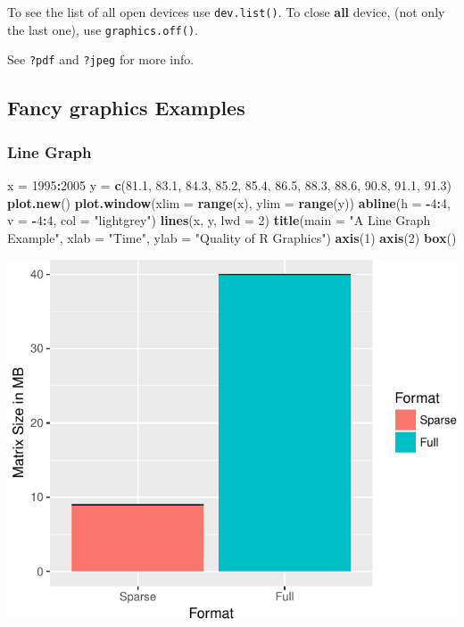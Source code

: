 \documentclass[]{book}
\newenvironment{Shaded}{\begin{snugshade}}{\end{snugshade}}
\newcommand{\KeywordTok}[1]{\textcolor[rgb]{0.13,0.29,0.53}{\textbf{#1}}}
\newcommand{\DataTypeTok}[1]{\textcolor[rgb]{0.13,0.29,0.53}{#1}}
\newcommand{\DecValTok}[1]{\textcolor[rgb]{0.00,0.00,0.81}{#1}}
\newcommand{\FloatTok}[1]{\textcolor[rgb]{0.00,0.00,0.81}{#1}}
\newcommand{\StringTok}[1]{\textcolor[rgb]{0.31,0.60,0.02}{#1}}
\newcommand{\OperatorTok}[1]{\textcolor[rgb]{0.81,0.36,0.00}{\textbf{#1}}}
\newcommand{\NormalTok}[1]{#1}
\theoremstyle{definition}
\theoremstyle{definition}
\theoremstyle{definition}
\theoremstyle{remark}
\begin{document}
To see the list of all open devices use \texttt{dev.list()}. To close
\textbf{all} device, (not only the last one), use
\texttt{graphics.off()}.

See \texttt{?pdf} and \texttt{?jpeg} for more info.

\subsection{Fancy graphics Examples}\label{fancy}

\subsubsection{Line Graph}\label{line-graph}

\begin{Shaded}
\begin{Highlighting}[]
\NormalTok{x =}\StringTok{ }\DecValTok{1995}\OperatorTok{:}\DecValTok{2005}
\NormalTok{y =}\StringTok{ }\KeywordTok{c}\NormalTok{(}\FloatTok{81.1}\NormalTok{, }\FloatTok{83.1}\NormalTok{, }\FloatTok{84.3}\NormalTok{, }\FloatTok{85.2}\NormalTok{, }\FloatTok{85.4}\NormalTok{, }\FloatTok{86.5}\NormalTok{, }\FloatTok{88.3}\NormalTok{, }\FloatTok{88.6}\NormalTok{, }\FloatTok{90.8}\NormalTok{, }\FloatTok{91.1}\NormalTok{, }\FloatTok{91.3}\NormalTok{)}
\KeywordTok{plot.new}\NormalTok{()}
\KeywordTok{plot.window}\NormalTok{(}\DataTypeTok{xlim =} \KeywordTok{range}\NormalTok{(x), }\DataTypeTok{ylim =} \KeywordTok{range}\NormalTok{(y))}
\KeywordTok{abline}\NormalTok{(}\DataTypeTok{h =} \OperatorTok{-}\DecValTok{4}\OperatorTok{:}\DecValTok{4}\NormalTok{, }\DataTypeTok{v =} \OperatorTok{-}\DecValTok{4}\OperatorTok{:}\DecValTok{4}\NormalTok{, }\DataTypeTok{col =} \StringTok{"lightgrey"}\NormalTok{)}
\KeywordTok{lines}\NormalTok{(x, y, }\DataTypeTok{lwd =} \DecValTok{2}\NormalTok{)}
\KeywordTok{title}\NormalTok{(}\DataTypeTok{main =} \StringTok{"A Line Graph Example"}\NormalTok{,}
        \DataTypeTok{xlab =} \StringTok{"Time"}\NormalTok{,}
        \DataTypeTok{ylab =} \StringTok{"Quality of R Graphics"}\NormalTok{)}
\KeywordTok{axis}\NormalTok{(}\DecValTok{1}\NormalTok{)}
\KeywordTok{axis}\NormalTok{(}\DecValTok{2}\NormalTok{)}
\KeywordTok{box}\NormalTok{()}
\end{Highlighting}
\end{Shaded}

\includegraphics[width=0.5\linewidth]{Rcourse_files/figure-latex/unnamed-chunk-276-1}
\end{document}
